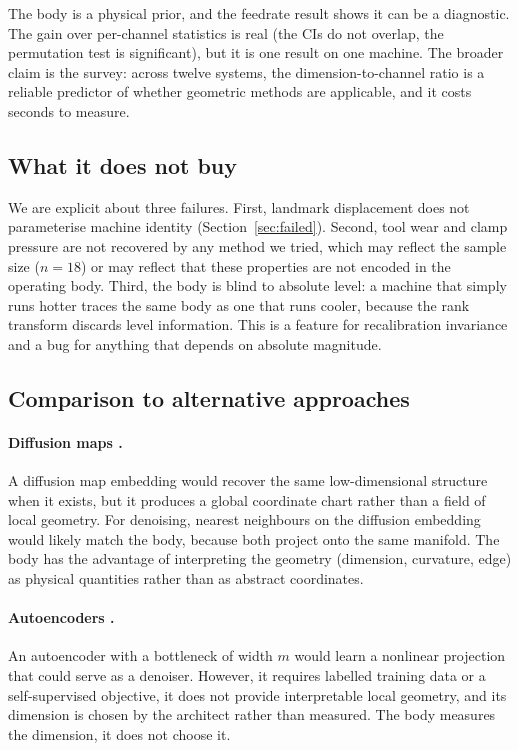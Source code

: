 \documentclass[11pt]{article}
\begin{document}
The body is a physical prior, and the feedrate result shows it can be a
diagnostic. The gain over per-channel statistics is real (the CIs do not
overlap, the permutation test is significant), but it is one result on one
machine. The broader claim is the survey: across twelve systems, the
dimension-to-channel ratio is a reliable predictor of whether geometric
methods are applicable, and it costs seconds to measure.

\subsection{What it does not buy}

We are explicit about three failures. First, landmark displacement does not
parameterise machine identity (Section~\ref{sec:failed}). Second, tool wear
and clamp pressure are not recovered by any method we tried, which may
reflect the sample size ($n=18$) or may reflect that these properties are not
encoded in the operating body. Third, the body is blind to absolute level: a
machine that simply runs hotter traces the same body as one that runs cooler,
because the rank transform discards level information. This is a feature for
recalibration invariance and a bug for anything that depends on absolute
magnitude.

\subsection{Comparison to alternative approaches}

\paragraph{Diffusion maps \cite{coifman2006}.} A diffusion map embedding
would recover the same low-dimensional structure when it exists, but it
produces a global coordinate chart rather than a field of local geometry.
For denoising, nearest neighbours on the diffusion embedding would likely
match the body, because both project onto the same manifold. The body has the
advantage of interpreting the geometry (dimension, curvature, edge) as
physical quantities rather than as abstract coordinates.

\paragraph{Autoencoders \cite{goodfellow2016}.} An autoencoder with a
bottleneck of width $m$ would learn a nonlinear projection that could serve
as a denoiser. However, it requires labelled training data or a
self-supervised objective, it does not provide interpretable local geometry,
and its dimension is chosen by the architect rather than measured. The body
measures the dimension, it does not choose it.
\end{document}
